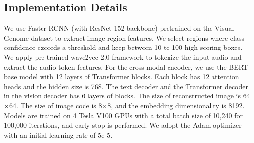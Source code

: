 \documentclass[10pt,twocolumn,letterpaper]{article}
\begin{document}
\subsection{Implementation Details}
We use Faster-RCNN \cite{ren2015faster} (with ResNet-152 backbone) pretrained on the Visual Genome dataset \cite{krishna2017visual} to extract image region features. We select regions where class confidence exceeds a threshold and keep between 10 to 100 high-scoring boxes. We apply pre-trained wave2vec 2.0 \cite{wav2vec} framework to tokenize the input audio and extract the audio token features. For the cross-modal encoder, we use the BERT-base model \cite{bert} with 12 layers of Transformer blocks. Each block has 12 attention heads and the hidden size is 768. The text decoder and the Transformer decoder in the vision decoder has 6 layers of blocks. The size of reconstructed image is 64$\times$64. The size of image code is 8$\times$8, and the embedding dimensionality is 8192. Models are trained on 4 Tesla V100 GPUs with a total batch size of 10,240 for 100,000 iterations, and early stop is performed. We adopt the Adam optimizer with an initial learning rate of 5e-5. 

\begin{table}[!t]
\begin{center}
\caption{Linear probe results on multi-label classification task. The performance is evaluated on Open Images val set.}
\label{tab:mulcls}
\end{center}
\end{table}
\end{document}
